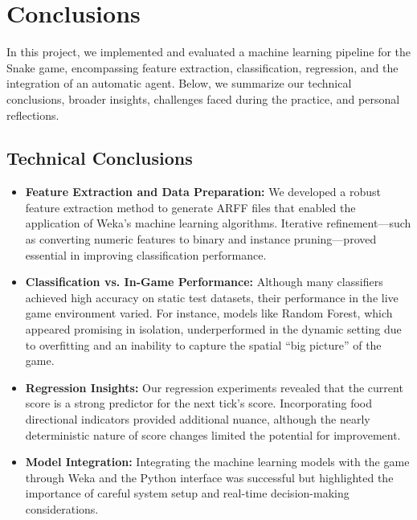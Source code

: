 \documentclass[12pt,a4paper]{article}
\begin{document}
\newpage

\newpage
\section{Conclusions}

In this project, we implemented and evaluated a machine learning pipeline for the Snake game, encompassing feature extraction, classification, regression, and the integration of an automatic agent. Below, we summarize our technical conclusions, broader insights, challenges faced during the practice, and personal reflections.

\subsection*{Technical Conclusions}
\begin{itemize}
    \item \textbf{Feature Extraction and Data Preparation:}  
    We developed a robust feature extraction method to generate ARFF files that enabled the application of Weka’s machine learning algorithms. Iterative refinement—such as converting numeric features to binary and instance pruning—proved essential in improving classification performance.
    
    \item \textbf{Classification vs. In-Game Performance:}  
    Although many classifiers achieved high accuracy on static test datasets, their performance in the live game environment varied. For instance, models like Random Forest, which appeared promising in isolation, underperformed in the dynamic setting due to overfitting and an inability to capture the spatial “big picture” of the game.
    
    \item \textbf{Regression Insights:}  
    Our regression experiments revealed that the current score is a strong predictor for the next tick's score. Incorporating food directional indicators provided additional nuance, although the nearly deterministic nature of score changes limited the potential for improvement.
    
    \item \textbf{Model Integration:}  
    Integrating the machine learning models with the game through Weka and the Python interface was successful but highlighted the importance of careful system setup and real-time decision-making considerations.
\end{itemize}
\end{document}
